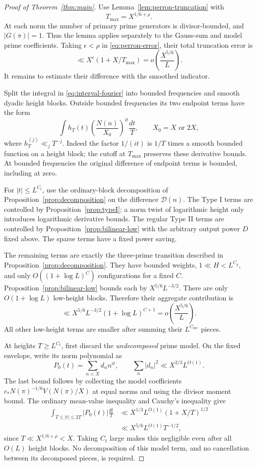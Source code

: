 \begin{proof}[Proof of Theorem~\ref{thm:main}]
Use Lemma~\ref{lem:perron-truncation} with
\[
 T_{\max}=X^{1/6+\rho}.
\]
At each norm the number of primary prime generators is divisor-bounded,
and \(|G(\pi)|=1\). Thus the lemma applies separately to the
Gauss-sum and model prime coefficients. Taking \(\epsilon<\rho\)
in \eqref{eq:perron-error}, their total truncation error is
\[
 \ll X^\epsilon(1+X/T_{\max})
   =o\!\left(\frac{X^{5/6}}L\right).
\]
It remains to estimate their difference with the smoothed indicator.

Split the integral in \eqref{eq:interval-fourier} into bounded
frequencies and smooth dyadic height blocks. Outside bounded
frequencies its two endpoint terms have the form
\[
 \int h_T(t)\left(\frac{N(n)}{X_0}\right)^{it}\frac{dt}T,
 \qquad X_0=X\text{ or }2X,
\]
where \(h_T^{(j)}\ll_jT^{-j}\). Indeed the factor \(1/(it)\)
is \(1/T\) times a smooth bounded function on a height block;
the cutoff at \(T_{\max}\) preserves these derivative bounds.
At bounded frequencies the original difference of endpoint terms
is bounded, including at zero.

For \(|t|\le L^{C_t}\), use the ordinary-block decomposition of
Proposition~\ref{prop:decomposition} on the difference
\(\mathcal D(n)\). The Type I terms are controlled by
Proposition~\ref{prop:typeI}; a norm twist of logarithmic height
only introduces logarithmic derivative bounds. The regular Type II
terms are controlled by Proposition~\ref{prop:bilinear-low} with
the arbitrary output power \(D\) fixed above. The sparse terms
have a fixed power saving.

The remaining terms are exactly the three-prime transition described
in Proposition~\ref{prop:decomposition}. They have bounded weights,
\(1\ll H<L^{C_g}\), and only
\(O((1+\log L)^{C})\) configurations for a fixed \(C\).
Proposition~\ref{prop:bilinear-low} bounds each by
\(X^{5/6}L^{-3/2}\). There are only \(O(1+\log L)\)
low-height blocks. Therefore their aggregate contribution is
\[
 \ll X^{5/6}L^{-3/2}(1+\log L)^{C+1}
   =o\!\left(\frac{X^{5/6}}L\right).
\]
All other low-height terms are smaller after summing their
\(L^{C_{\mathrm{dec}}}\) pieces.

At heights \(T\ge L^{C_t}\), first discard the \emph{undecomposed}
prime model. On the fixed envelope, write its norm polynomial as
\[
 P_0(t)=\sum_{n\asymp X}d_n n^{it},\qquad
 \sum_n|d_n|^2\ll X^{2/3}L^{O(1)}.
\]
The last bound follows by collecting the model coefficients
\(c_*N(\pi)^{-1/6}V(N(\pi)/X)\) at equal norms and using the
divisor moment bound. The ordinary mean-value inequality and
Cauchy's inequality give
\begin{align*}
 \int_{T\le|t|\le2T}|P_0(t)|\frac{dt}T
 &\ll X^{1/3}L^{O(1)}(1+X/T)^{1/2}\\
 &\ll X^{5/6}L^{O(1)}T^{-1/2},
\end{align*}
since \(T\ll X^{1/6+\rho}<X\). Taking \(C_t\) large makes
this negligible even after all \(O(L)\) height blocks. No
decomposition of this model term, and no cancellation between its
decomposed pieces, is required.


\end{proof}
